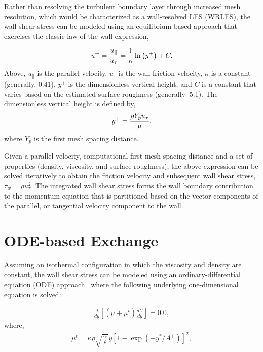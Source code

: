 \documentclass{article}
\begin{document}
Rather than resolving the turbulent boundary layer through increased mesh resolution, which 
would be characterized as a wall-resolved LES (WRLES), the wall shear stress can be 
modeled using an equilibrium-based approach that exercises the classic law of the wall
expression,

\begin{align}
u^+ = {u_{\|} \over u_{\tau}} 
    = { 1 \over \kappa } \ln \left(y^+\right) + C.
\label{law_wall}
\end{align}
Above, $u_{\|}$ is the parallel velocity, $u_\tau$ is the wall friction velocity, $\kappa$ is a constant
(generally, 0.41), $y^+$ is the dimensionless vertical height, and $C$ is a constant that varies
based on the estimated surface roughness (generally $~$5.1). The dimensionless vertical height is defined
by,
%
\begin{align} 
        y^+ =  {{ \rho Y_p u_{\tau}} \over {\mu }},
\label{yplus}
\end{align}
where $Y_p$ is the first mesh spacing distance.

Given a parallel velocity, computational first mesh spacing distance and a set of properties (density, 
viscosity, and surface roughness), the above expression can be solved iteratively to obtain the friction 
velocity and subsequent wall shear stress, $\tau_w = \rho u^2_\tau$. The integrated wall shear stress forms
the wall boundary contribution to the momentum equation that is partitioned based on the vector components 
of the parallel, or tangential velocity component to the wall.

\section{ODE-based Exchange}
Assuming an isothermal configuration in which the viscosity and density are constant, the wall shear stress 
can be modeled using an ordinary-differential equation (ODE) approach~\cite{larsson2016} where the 
following underlying one-dimensional equation is solved:

\begin{align} 
       \frac{d}{dy}\left[ \left(\mu + \mu^t\right) \frac{dU}{dy}  \right] = 0.0,
\label{odeExpression}
\end{align}
where,
%
\begin{align} 
       \mu^t = \kappa \rho \sqrt{\frac{\tau_w}{\rho}} y \left[1 - \exp\left(-y^*/A^+\right)\right]^2,
\label{odeExpressionMuT}
\end{align}
\end{document}
